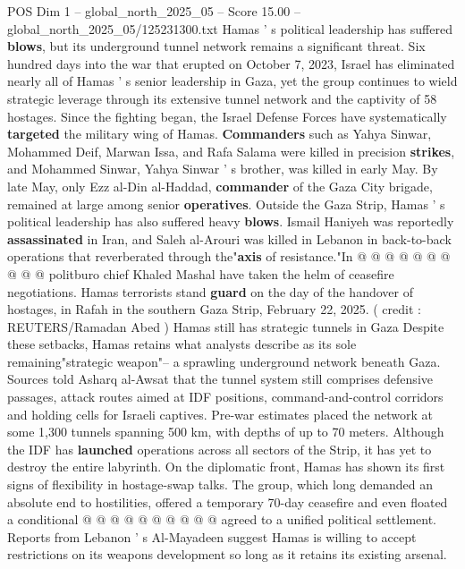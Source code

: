\begin{textsample}{POS Dim 1 – global\_north\_2025\_05 – Score 15.00 – global\_north\_2025\_05/125231300.txt}  \label{ex:f1_pos_375}
Hamas ' s political leadership has suffered \textbf{blows}, but its underground tunnel network remains a significant threat.
Six hundred days into the war that erupted on October 7, 2023, Israel has eliminated nearly all of Hamas ' s senior leadership in Gaza, yet the group continues to wield strategic leverage through its extensive tunnel network and the captivity of 58 hostages.
Since the fighting began, the Israel Defense Forces have systematically \textbf{targeted} the military wing of Hamas. \textbf{Commanders} such as Yahya Sinwar, Mohammed Deif, Marwan Issa, and Rafa Salama were killed in precision \textbf{strikes}, and Mohammed Sinwar, Yahya Sinwar ' s brother, was killed in early May.
By late May, only Ezz al-Din al-Haddad, \textbf{commander} of the Gaza City brigade, remained at large among senior \textbf{operatives}.
Outside the Gaza Strip, Hamas ' s political leadership has also suffered heavy \textbf{blows}.
Ismail Haniyeh was reportedly \textbf{assassinated} in Iran, and Saleh al-Arouri was killed in Lebanon in back-to-back operations that reverberated through the"\textbf{axis} of resistance."In @ @ @ @ @ @ @ @ @ @ politburo chief Khaled Mashal have taken the helm of ceasefire negotiations.
Hamas terrorists stand \textbf{guard} on the day of the handover of hostages, in Rafah in the southern Gaza Strip, February 22, 2025. ( credit : REUTERS/Ramadan Abed ) Hamas still has strategic tunnels in Gaza Despite these setbacks, Hamas retains what analysts describe as its sole remaining"strategic weapon"-- a sprawling underground network beneath Gaza.
Sources told Asharq al-Awsat that the tunnel system still comprises defensive passages, attack routes aimed at IDF positions, command-and-control corridors and holding cells for Israeli captives.
Pre-war estimates placed the network at some 1,300 tunnels spanning 500 km, with depths of up to 70 meters.
Although the IDF has \textbf{launched} operations across all sectors of the Strip, it has yet to destroy the entire labyrinth.
On the diplomatic front, Hamas has shown its first signs of flexibility in hostage-swap talks.
The group, which long demanded an absolute end to hostilities, offered a temporary 70-day ceasefire and even floated a conditional @ @ @ @ @ @ @ @ @ @ agreed to a unified political settlement.
Reports from Lebanon ' s Al-Mayadeen suggest Hamas is willing to accept restrictions on its weapons development so long as it retains its existing arsenal.

\end{textsample}
